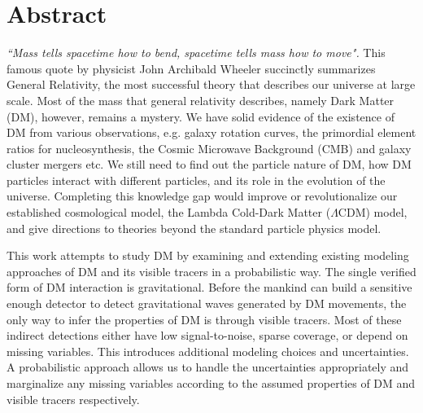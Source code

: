 \documentclass[ucdthesis.tex]{subfiles}
\begin{document}

    \doublespacing
		\section*{Abstract} 

		{\it ``Mass tells spacetime how to bend, spacetime tells mass how to move".}
		This famous quote by physicist John Archibald Wheeler succinctly summarizes General
		Relativity,  the most successful theory that describes our universe
		at large scale. Most of the mass that general relativity describes,
		namely Dark Matter (DM), however, remains a mystery.  
		We have solid evidence of the existence of DM from various
		observations, e.g.	galaxy rotation
		curves, the primordial element ratios for nucleosynthesis, the Cosmic
		Microwave Background (CMB) and galaxy cluster mergers etc.
		We still need to find out the particle nature of DM,  
		how DM particles interact with different particles, and its role in the
		evolution of the universe. Completing this knowledge gap would improve or 
		revolutionalize our established cosmological model,
		the Lambda Cold-Dark Matter	($\Lambda$CDM) model, 
		and give directions to theories beyond the standard particle
		physics model. 

			This work attempts to study DM by examining and
		extending existing modeling approaches of DM and its visible tracers in a
		probabilistic way. The single verified form of 
		DM interaction is gravitational. Before the mankind can build a sensitive 
		enough detector to detect gravitational waves generated by DM movements, the 
		only way to infer the properties of DM is through visible tracers. Most of 
		these indirect detections	either have low signal-to-noise, sparse coverage, 
		or depend on missing
		variables. This introduces additional
		modeling choices and uncertainties. A probabilistic approach allows us to
		handle the uncertainties appropriately and marginalize any missing variables 
		according to the assumed properties of DM and visible tracers respectively. 	
		
\end{document}

